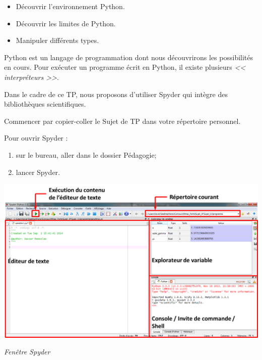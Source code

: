 \documentclass[10pt]{article}
\newif\ifxp
\begin{document}
\ifxp

\else

\fi



 \renewcommand{\baselinestretch}{1.2}
\setlength{\parskip}{2ex plus 0.5ex minus 0.2ex}


\begin{obj}
\begin{itemize}
\item Découvrir l'environnement Python.
\item Découvrir les limites de Python.
\item Manipuler différents types.
\end{itemize}
\end{obj}
 



\begin{rem}
Python est un langage de programmation dont nous découvrirons les possibilités en cours. 
Pour exécuter un programme écrit en Python, il existe plusieurs \textit{<< interpréteurs >>}.

Dans le cadre de ce TP, nous proposons d'utiliser Spyder qui intègre des bibliothèques scientifiques.
\end{rem}

Commencer par copier-coller le Sujet de TP dans votre répertoire personnel.

Pour ouvrir Spyder :
\begin{enumerate}
\item sur le bureau, aller dans le dossier Pédagogie;
\item lancer Spyder.
\end{enumerate}

\begin{center}
\includegraphics[width=.9\textwidth]{images/Spyder}

\textit{Fenêtre Spyder}
\end{center}
\end{document}
